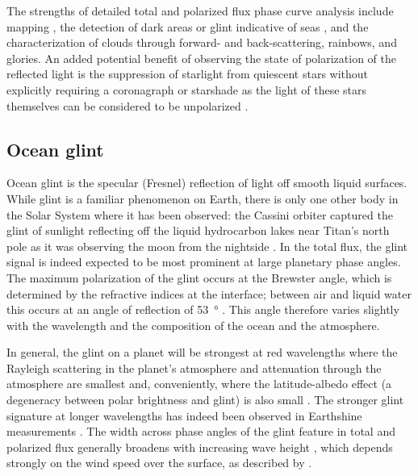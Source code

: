 \documentclass[
    usenatbib,
]{mnras}
\begin{document}
The strengths of detailed total and polarized flux phase curve analysis include mapping \citep{2001Natur.412..885F, berdyugina2019surface, 2022A&A...664A..59M}, the detection of dark areas or glint indicative of seas \citep{groot2020, cowan2008inverting, lustig2019}, and the characterization of clouds through forward- and back-scattering, rainbows, and glories.
%
An added potential benefit of observing the state of polarization of the reflected light is the suppression of starlight from quiescent stars without explicitly requiring a coronagraph or starshade as the light of these stars themselves can be considered to be unpolarized \citep{kemp1987}.


\subsection{Ocean glint}

Ocean glint is the specular (Fresnel) reflection of light off smooth liquid surfaces. While glint is a familiar phenomenon on Earth, there is only
one other body in the Solar System where it has been observed: 
the Cassini orbiter captured the glint of sunlight reflecting off the
liquid hydrocarbon lakes near Titan's north pole as it was observing
the moon from the nightside \citep{2010GeoRL..37.7104S}.
%
In the total flux, the glint signal is indeed expected to be most prominent at large planetary phase angles.
%
The maximum polarization of the glint occurs at the Brewster angle, which is determined by the refractive indices at the interface; between air and liquid water this occurs at an angle of reflection of \qty{53}{\degree} \citep[i.e., at a planetary phase angle of \qty{127}{\degree}; see, e.g.,][]{2008Icar..195..927W}.
%
This angle therefore varies slightly with the wavelength and the composition of the ocean and the atmosphere.
%

In general, the glint on a planet will be strongest at red wavelengths where the Rayleigh scattering in the planet's atmosphere and attenuation through the atmosphere are smallest \citep{Zugger_2011} and, conveniently, where the latitude-albedo effect (a degeneracy between polar brightness and glint) is also small \citep{2012ApJ...752L...3C}.
%
The stronger glint signature at longer wavelengths has indeed been observed in Earthshine measurements \citep{Emde2017,sterzik2019, takahashi2021}.
%
The width across phase angles of the glint feature in total and polarized flux generally
broadens with increasing wave height \citep{kopparla2018, Zugger_2010, treesandstam2019, trees2022}, which depends strongly on the wind speed over the surface, as described by \citep{CoxMunk1954}.
%
\end{document}
